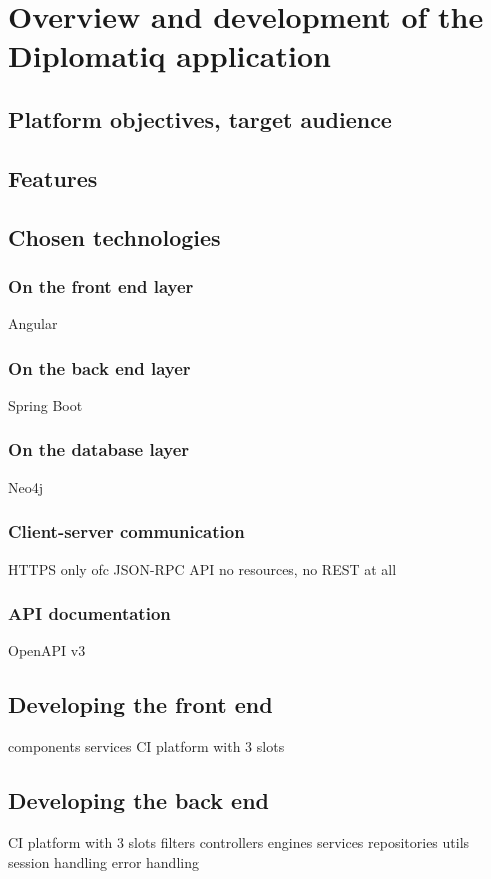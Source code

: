 \chapter{Overview and development of the Diplomatiq application}
\label{chapter:diplomatiq}

\section{Platform objectives, target audience}

\section{Features}

\section{Chosen technologies}
\subsection{On the front end layer}
Angular

\subsection{On the back end layer}
Spring Boot

\subsection{On the database layer}
Neo4j

\subsection{Client-server communication}
HTTPS only ofc
JSON-RPC API
no resources, no REST at all

\subsection{API documentation}
OpenAPI v3


\section{Developing the front end}
components
services
CI
platform with 3 slots

\section{Developing the back end}
CI
platform with 3 slots
filters
controllers
engines
services
repositories
utils
session handling
error handling
